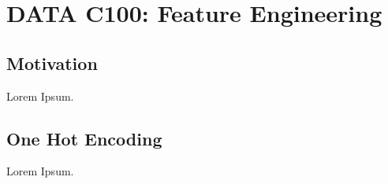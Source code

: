 \chapter{DATA C100: Feature Engineering}

\section{Motivation}
Lorem Ipsum.

\section{One Hot Encoding}
Lorem Ipsum.
